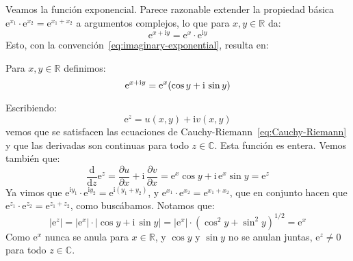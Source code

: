   Veamos la función exponencial.
  Parece razonable extender la propiedad básica
    \(\mathrm{e}^{x_1} \cdot \mathrm{e}^{x_2}
	= \mathrm{e}^{x_1 + x_2}\)
  a argumentos complejos,
  lo que para \(x, y \in \mathbb{R}\) da:
  \begin{equation*}
    \mathrm{e}^{x + \mathrm{i} y}
      = \mathrm{e}^x \cdot \mathrm{e}^{\mathrm{i} y}
  \end{equation*}
  Esto,
  con la convención~\eqref{eq:imaginary-exponential},
  resulta en:
  \begin{definition}
    Para \(x, y \in \mathbb{R}\) definimos:
    \begin{equation}
      \index{C (numeros complejos)@\(\mathbb{C}\) (números complejos)!exponencial|textbfhy}
      \label{eq:complex-exponential}
      \mathrm{e}^{x + \mathrm{i} y}
	= \mathrm{e}^x ( \cos y + \mathrm{i} \, \sin y )
    \end{equation}
  \end{definition}
  Escribiendo:
  \begin{equation*}
    \mathrm{e}^z
      = u(x, y) + \mathrm{i} v(x, y)
  \end{equation*}
  vemos que se satisfacen
  las ecuaciones de Cauchy-Riemann~\eqref{eq:Cauchy-Riemann}%
  y que las derivadas son continuas para todo \(z \in \mathbb{C}\).
  Esta función es entera.
  Vemos también que:
  \begin{equation}
    \label{eq:complex-exponential-derivative}
    \frac{\mathrm{d}}{\mathrm{d} z} \mathrm{e}^z
      = \frac{\partial u}{\partial x}
	  + \mathrm{i} \, \frac{\partial v}{\partial x}
      = \mathrm{e}^x \cos y + \mathrm{i} \, \mathrm{e}^x \sin y
      = \mathrm{e}^z
  \end{equation}
  Ya vimos que
    \(\mathrm{e}^{\mathrm{i} y_1} \cdot \mathrm{e}^{\mathrm{i} y_2}
	= \mathrm{e}^{\mathrm{i} (y_1 + y_2)}\),
  y
    \(\mathrm{e}^{x_1} \cdot \mathrm{e}^{x_2}
	= \mathrm{e}^{x_1 + x_2}\),
  que en conjunto hacen que
    \(\mathrm{e}^{z_1} \cdot \mathrm{e}^{z_2}
	= \mathrm{e}^{z_1 + z_2}\),
  como buscábamos.
  Notamos que:
  \begin{equation}
    \label{eq:complex-exponential-modulus}
    \left\lvert \mathrm{e}^z \right\rvert
      = \left\lvert \mathrm{e}^x \right\rvert \cdot
	  \left\lvert \cos y + \mathrm{i} \, \sin y \right\rvert
      = \left\lvert \mathrm{e}^x \right\rvert \cdot
	  \left( \cos^2 y + \sin^2 y \right)^{1/2}
      = \mathrm{e}^x
  \end{equation}
  Como \(\mathrm{e}^x\) nunca se anula para \(x \in \mathbb{R}\),
  y \(\cos y\) y \(\sin y\) no se anulan juntas,
  \(\mathrm{e}^z \ne 0\) para todo \(z \in \mathbb{C}\).

